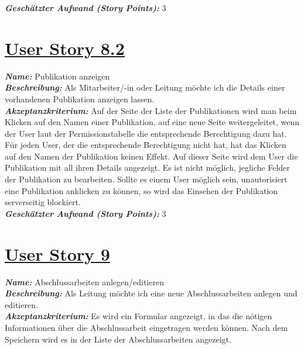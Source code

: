 \documentclass[12pt]{article}%
\begin{document}

\textbf{\textit{Geschätzter Aufwand (Story Points):}} 3
\\


\section*{\large \underline{User Story 8.2}}
\textit{\textbf{Name:}} Publikation anzeigen
\\

\textbf{\textit{Beschreibung:}} Als Mitarbeiter/-in  oder Leitung möchte ich die Details einer vorhandenen Publikation anzeigen lassen.
\\

\textbf{\textit{Akzeptanzkriterium:}} Auf der Seite der Liste der Publikationen wird man beim Klicken auf den Namen einer Publikation, auf eine neue Seite weitergeleitet, wenn der User laut der Permissionstabelle die entsprechende Berechtigung dazu hat. Für jeden User, der die entsprechende Berechtigung nicht hat, hat das Klicken auf den Namen der Publikation keinen Effekt. Auf dieser Seite wird dem User die Publikation mit all ihren Details angezeigt. Es ist nicht möglich, jegliche Felder der Publikation zu bearbeiten. Sollte es einem User möglich sein, unautorisiert eine Publikation anklicken zu können, so wird das Einsehen der Publikation serverseitig blockiert. \\


\textbf{\textit{Geschätzter Aufwand (Story Points):}} 3
\\

\section*{\large \underline{User Story 9}}
\textit{\textbf{Name:}} Abschlussarbeiten anlegen/editieren
\\

\textbf{\textit{Beschreibung:}} Als Leitung möchte ich eine neue Abschlussarbeiten anlegen und editieren.
\\

\textbf{\textit{Akzeptanzkriterium:}} Es wird ein Formular angezeigt, in das die nötigen Informationen über die Abschlussarbeit eingetragen werden können. Nach dem Speichern wird es in der Liste der Abschlussarbeiten angezeigt.
\\
\end{document}
